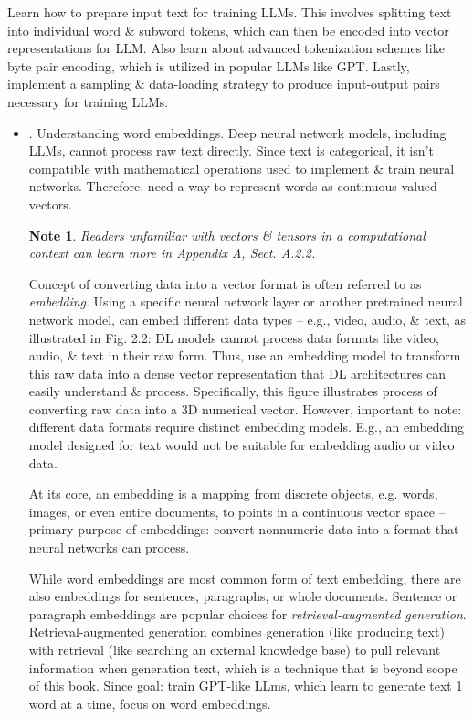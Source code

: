 \documentclass{article}
\newtheorem{note}{Note}
\begin{document}
\begin{itemize}
	Learn how to prepare input text for training LLMs. This involves splitting text into individual word \& subword tokens, which can then be encoded into vector representations for LLM. Also learn about advanced tokenization schemes like byte pair encoding, which is utilized in popular LLMs like GPT. Lastly, implement a sampling \& data-loading strategy to produce input-output pairs necessary for training LLMs.
	\begin{itemize}
		\item {. Understanding word embeddings.} Deep neural network models, including LLMs, cannot process raw text directly. Since text is categorical, it isn't compatible with mathematical operations used to implement \& train neural networks. Therefore, need a way to represent words as continuous-valued vectors.
		\begin{note}
			Readers unfamiliar with vectors \& tensors in a computational context can learn more in Appendix A, Sect. A.2.2.
		\end{note}
		Concept of converting data into a vector format is often referred to as {\it embedding}. Using a specific neural network layer or another pretrained neural network model, can embed different data types -- e.g., video, audio, \& text, as illustrated in {\sf Fig. 2.2: DL models cannot process data formats like video, audio, \& text in their raw form. Thus, use an embedding model to transform this raw data into a dense vector representation that DL architectures can easily understand \& process. Specifically, this figure illustrates process of converting raw data into a 3D numerical vector.} However, important to note: different data formats require distinct embedding models. E.g., an embedding model designed for text would not be suitable for embedding audio or video data.
		
		At its core, an embedding is a mapping from discrete objects, e.g. words, images, or even entire documents, to points in a continuous vector space -- primary purpose of embeddings: convert nonnumeric data into a format that neural networks can process.
		
		While word embeddings are most common form of text embedding, there are also embeddings for sentences, paragraphs, or whole documents. Sentence or paragraph embeddings are popular choices for {\it retrieval-augmented generation}. Retrieval-augmented generation combines generation (like producing text) with retrieval (like searching an external knowledge base) to pull relevant information when generation text, which is a technique that is beyond scope of this book. Since goal: train GPT-like LLms, which learn to generate text 1 word at a time, focus on word embeddings.
		

\end{itemize}
\end{itemize}
\end{document}
